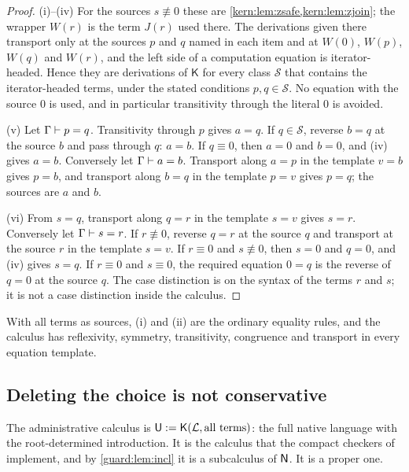\begin{proof}
(i)--(iv) For the sources $s\not\equiv 0$ these are
\cref{kern:lem:zsafe,kern:lem:zjoin}; the wrapper $W(r)$ is the term $J(r)$
used there.  The derivations given there transport only at the sources $p$
and $q$ named in each item and at $W(0)$, $W(p)$, $W(q)$ and $W(r)$, and
the left side of a computation equation is iterator-headed.  Hence they are
derivations of $\mathsf K$ for every class $\mathcal S$ that contains the
iterator-headed terms, under the stated conditions $p,q\in\mathcal S$.  No
equation with the source $0$ is used, and in particular transitivity
through the literal $0$ is avoided.

(v) Let $\Gamma\vdash p=q$.  Transitivity through $p$ gives $a=q$.  If
$q\in\mathcal S$, reverse $b=q$ at the source $b$ and pass through $q$:
$a=b$.  If $q\equiv 0$, then $a=0$ and $b=0$, and (iv) gives $a=b$.
Conversely let $\Gamma\vdash a=b$.  Transport along $a=p$ in the template
$v=b$ gives $p=b$, and transport along $b=q$ in the template $p=v$ gives
$p=q$; the sources are $a$ and $b$.

(vi) From $s=q$, transport along $q=r$ in the template $s=v$ gives $s=r$.
Conversely let $\Gamma\vdash s=r$.  If $r\not\equiv 0$, reverse $q=r$ at
the source $q$ and transport at the source $r$ in the template $s=v$.  If
$r\equiv 0$ and $s\not\equiv 0$, then $s=0$ and $q=0$, and (iv) gives $s=q$.
If $r\equiv 0$ and $s\equiv 0$, the required equation $0=q$ is the reverse
of $q=0$ at the source $q$.  The case distinction is on the syntax of the
terms $r$ and $s$; it is not a case distinction inside the calculus.
\end{proof}

With all terms as sources, (i) and (ii) are the ordinary equality rules,
and the calculus has reflexivity, symmetry, transitivity, congruence and
transport in every equation template.

\subsection{Deleting the choice is not conservative}

The administrative calculus is
$\mathsf U\mathrel{:=}\mathsf K(\mathcal L,\text{all terms})$: the full native
language with the root-determined introduction.  It is the calculus that the
compact checkers of  implement, and by
\cref{guard:lem:incl} it is a subcalculus of $\mathsf{N}$.  It is a proper one.

